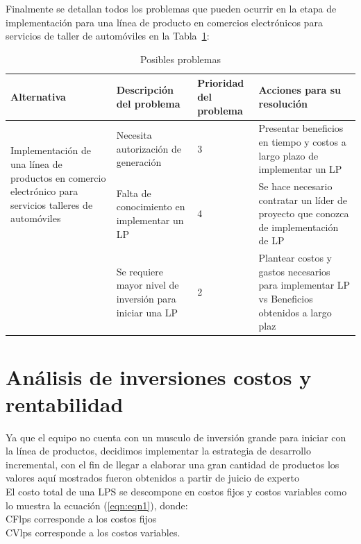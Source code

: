 \documentclass[10pt,a4paper,openany]{book}
\begin{document}
Finalmente se detallan todos los problemas que pueden ocurrir en la etapa de implementación para una línea de producto en comercios electrónicos para servicios de taller de automóviles en la Tabla~\ref{table:t8}:

\begin{table}[htbp]
\centering
\begin{tabular}{|p{4cm}|p{4cm}|p{2cm}|p{4cm}|} \hline
Alternativa & Descripción del problema & Prioridad del problema & Acciones para su resolución \\ \hline
\multirow{2}{3cm}{Implementación de una línea de productos en comercio electrónico para servicios talleres de automóviles} & Necesita autorización de generación & 3 & Presentar beneficios en tiempo y costos a largo plazo de implementar un LP \\
\cline{2-4} & Falta de conocimiento en implementar un LP & 4 & Se hace necesario contratar un líder de proyecto que conozca de implementación de LP\\ 
\cline{2-4} & Se requiere mayor nivel de inversión para iniciar una LP & 2 & Plantear costos y gastos necesarios para implementar LP vs Beneficios obtenidos a largo plaz\\  \hline
\end{tabular}
\caption{Posibles problemas}
\label{table:t8}
\end{table}


\section{Análisis de inversiones costos y rentabilidad}

Ya que el equipo no cuenta con un musculo de inversión grande para iniciar con la línea de productos, decidimos implementar la estrategia de desarrollo incremental, con el fin de llegar a elaborar una gran cantidad de productos los valores aquí mostrados fueron obtenidos a partir de juicio de experto\\

El costo total de una LPS se descompone en costos fijos y costos variables como lo muestra la ecuación (\ref{eqn:eqn1}), donde:\\ CFlps corresponde a los costos fijos \\ CVlps corresponde a los costos variables.
\end{document}
